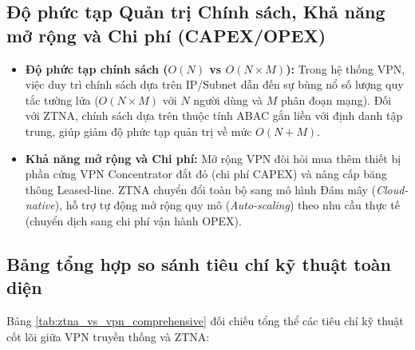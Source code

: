 \subsection{Độ phức tạp Quản trị Chính sách, Khả năng mở rộng và Chi phí (CAPEX/OPEX)}
\label{subsec:4_3_3}

\begin{itemize}
    \item \textbf{Độ phức tạp chính sách ($O(N)$ vs $O(N \times M)$):} Trong hệ thống VPN, việc duy trì chính sách dựa trên IP/Subnet dẫn đến sự bùng nổ số lượng quy tắc tường lửa ($O(N \times M)$ với $N$ người dùng và $M$ phân đoạn mạng). Đối với ZTNA, chính sách dựa trên thuộc tính ABAC gắn liền với định danh tập trung, giúp giảm độ phức tạp quản trị về mức $O(N + M)$.
    \item \textbf{Khả năng mở rộng và Chi phí:} Mở rộng VPN đòi hỏi mua thêm thiết bị phần cứng VPN Concentrator đắt đỏ (chi phí CAPEX) và nâng cấp băng thông Leased-line. ZTNA chuyển đổi toàn bộ sang mô hình Đám mây (\textit{Cloud-native}), hỗ trợ tự động mở rộng quy mô (\textit{Auto-scaling}) theo nhu cầu thực tế (chuyển dịch sang chi phí vận hành OPEX).
\end{itemize}

\subsection{Bảng tổng hợp so sánh tiêu chí kỹ thuật toàn diện}
\label{subsec:4_3_4}

Bảng \ref{tab:ztna_vs_vpn_comprehensive} đối chiếu tổng thể các tiêu chí kỹ thuật cốt lõi giữa VPN truyền thống và ZTNA:

